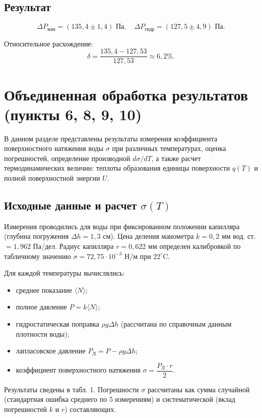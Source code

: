 \documentclass[a4paper, 12pt]{article}
\begin{document}
\subsection*{Результат}
\[
\Delta P_{\text{ман}} = (135,4 \pm 1,4) \text{ Па},\quad
\Delta P_{\text{гидр}} = (127,5 \pm 4,9) \text{ Па}.
\]

Относительное расхождение:
\[
\delta = \frac{135,4 - 127,53}{127,53} \approx 6,2\%.
\]





\section*{Объединенная обработка результатов (пункты 6, 8, 9, 10)}

В данном разделе представлены результаты измерения коэффициента поверхностного натяжения воды \(\sigma\) при различных температурах, оценка погрешностей, определение производной \(d\sigma/dT\), а также расчет термодинамических величин: теплоты образования единицы поверхности \(q(T)\) и полной поверхностной энергии \(U\).

\subsection*{Исходные данные и расчет \(\sigma(T)\)}

Измерения проводились для воды при фиксированном положении капилляра (глубина погружения \(\Delta h = 1,3\) см). Цена деления манометра \(k = 0,2\) мм вод. ст. \(= 1,962\) Па/дел. Радиус капилляра \(r = 0,622\) мм определен калибровкой по табличному значению \(\sigma = 72,75 \cdot 10^{-3}\) Н/м при \(22^\circ\)C.

Для каждой температуры вычислялись:
\begin{itemize}
    \item среднее показание \(\langle N \rangle\);
    \item полное давление \(P = k \langle N \rangle\);
    \item гидростатическая поправка \(\rho g \Delta h\) (рассчитана по справочным данным плотности воды);
    \item лапласовское давление \(P_{\text{Л}} = P - \rho g \Delta h\);
    \item коэффициент поверхностного натяжения \(\sigma = \dfrac{P_{\text{Л}} \cdot r}{2}\).
\end{itemize}

Результаты сведены в табл. 1. Погрешности \(\sigma\) рассчитаны как сумма случайной (стандартная ошибка среднего по 5 измерениям) и систематической (вклад погрешностей \(k\) и \(r\)) составляющих.
\end{document}

